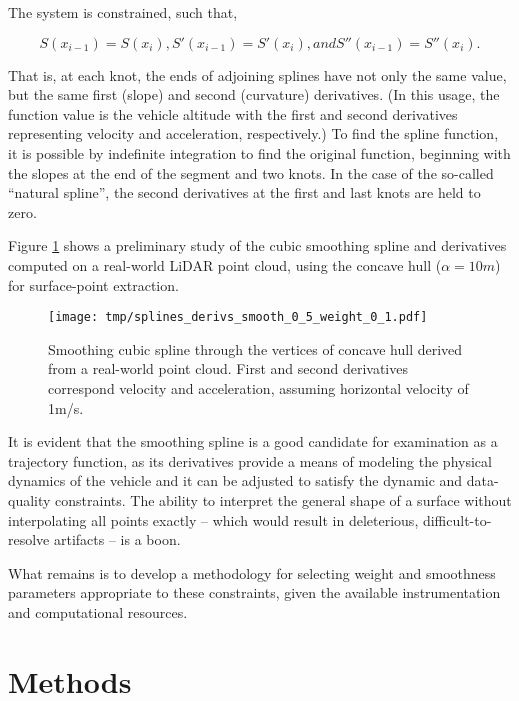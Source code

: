 \documentclass[doc]{apa6}
\begin{document}
The system is constrained, such that,

\begin{equation}
S(x_{i-1}) = S(x_i),
S'(x_{i-1}) = S'(x_i), and 
S''(x_{i-1}) = S''(x_i).
\end{equation}

That is, at each knot, the ends of adjoining splines have not only the same value, but the same first (slope) and second (curvature) derivatives. (In this usage, the function value is the vehicle altitude with the first and second derivatives representing velocity and acceleration, respectively.) To find the spline function, it is possible by indefinite integration to find the original function, beginning with the slopes at the end of the segment and two knots. In the case of the so-called ``natural spline'', the second derivatives at the first and last knots are held to zero. 

Figure \ref{fig:cubic_derivatives} shows a preliminary study of the cubic smoothing spline and derivatives computed on a real-world LiDAR point cloud, using the concave hull ($\alpha = 10m$) for surface-point extraction.

\begin{figure} %
\texttt{[image: tmp/splines\_derivs\_smooth\_0\_5\_weight\_0\_1.pdf]} 
\caption{Smoothing cubic spline through the vertices of concave hull derived from a real-world point cloud. First and second derivatives correspond velocity and acceleration, assuming horizontal velocity of 1m/s.}
\label{fig:cubic_derivatives}
\end{figure}

It is evident that the smoothing spline is a good candidate for examination as a trajectory function, as its derivatives provide a means of modeling the physical dynamics of the vehicle and it can be adjusted to satisfy the dynamic and data-quality constraints. The ability to interpret the general shape of a surface without interpolating all points exactly -- which would result in deleterious, difficult-to-resolve artifacts -- is a boon.

What remains is to develop a methodology for selecting weight and smoothness parameters appropriate to these constraints, given the available instrumentation and computational resources.


\section{Methods}
\end{document}
